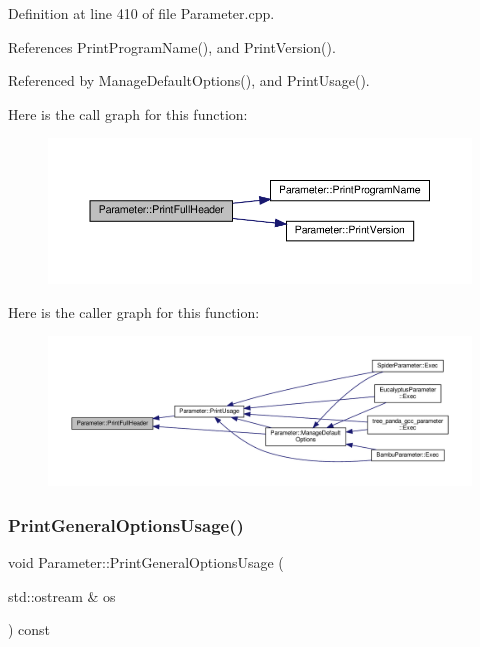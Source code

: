 Definition at line 410 of file Parameter.\+cpp.



References Print\+Program\+Name(), and Print\+Version().



Referenced by Manage\+Default\+Options(), and Print\+Usage().

Here is the call graph for this function\+:
\nopagebreak
\begin{figure}[H]
\begin{center}
\leavevmode
\includegraphics[width=350pt]{dc/dab/classParameter_a6fe1104ddce89c78863f29884d1595b5_cgraph}
\end{center}
\end{figure}
Here is the caller graph for this function\+:
\nopagebreak
\begin{figure}[H]
\begin{center}
\leavevmode
\includegraphics[width=350pt]{dc/dab/classParameter_a6fe1104ddce89c78863f29884d1595b5_icgraph}
\end{center}
\end{figure}
\mbox{\label{classParameter_a5946b2b87c96920a76dfb47ac03300e9}} 
\subsubsection{\texorpdfstring{Print\+General\+Options\+Usage()}{PrintGeneralOptionsUsage()}}
{\footnotesize\ttfamily void Parameter\+::\+Print\+General\+Options\+Usage (\begin{DoxyParamCaption}\item[{std\+::ostream \&}]{os }\end{DoxyParamCaption}) const\hspace{0.3cm}{\ttfamily [protected]}}



